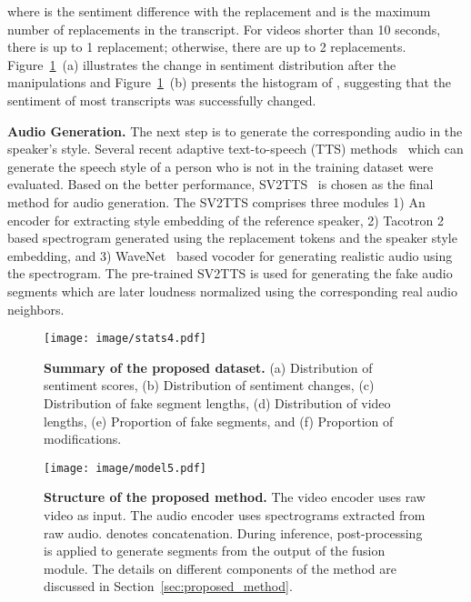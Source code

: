 \documentclass[conference, a4paper]{IEEEtran}
\begin{document}
where  is the sentiment difference with the replacement  and  is the maximum number of replacements in the transcript. For videos shorter than 10 seconds, there is up to 1 replacement; otherwise, there are up to 2 replacements. Figure~\ref{fig:data_distribution}~(a) illustrates the change in sentiment distribution after the manipulations and Figure~\ref{fig:data_distribution}~(b) presents the histogram of , suggesting that the sentiment of most transcripts was successfully changed.

\noindent \textbf{Audio Generation.} The next step is to generate the corresponding audio in the speaker’s style. Several recent adaptive text-to-speech (TTS)  methods~\cite{jia_transfer_2018, casanova_sc-glowtts_2021, neekhara_expressive_2021} which can generate the speech style of a person who is not in the training dataset were evaluated. Based on the better performance, SV2TTS~\cite{jia_transfer_2018} is chosen as the final method for audio generation. The SV2TTS comprises three modules 1) An encoder for extracting style embedding of the reference speaker, 2) Tacotron 2~\cite{shen_natural_2018} based spectrogram generated using the replacement tokens and the speaker style embedding, and 3) WaveNet~\cite{oord_wavenet_2016} based vocoder for generating realistic audio using the spectrogram. The pre-trained SV2TTS is used for generating the fake audio segments which are later loudness normalized using the corresponding real audio neighbors.

\begin{figure}[t]
\centering
\texttt{[image: image/stats4.pdf]}
\caption{\textbf{Summary of the proposed dataset.} (a) Distribution of sentiment scores, (b) Distribution of sentiment changes, (c) Distribution of fake segment lengths, (d) Distribution of video lengths, (e) Proportion of fake segments, and (f) Proportion of modifications.}
\label{fig:data_distribution}
\end{figure}

\begin{figure*}[t]
\centering
\texttt{[image: image/model5.pdf]}
\caption{\textbf{Structure of the proposed method.} The video encoder uses raw video as input. The audio encoder uses spectrograms extracted from raw audio.  denotes concatenation. During inference, post-processing is applied to generate segments from the output of the fusion module. The details on different components of the method are discussed in Section~\ref{sec:proposed_method}.}
\label{fig:model}
\end{figure*}
\end{document}
